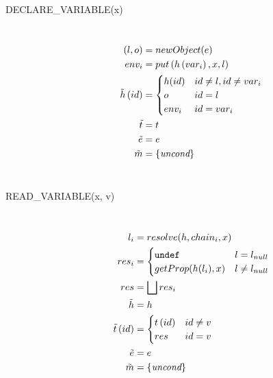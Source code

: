 \begin{description}
  \item[{\small\ttfamily DECLARE\_VARIABLE(x)}] ~\\%
  \[
  \begin{aligned}
    \left( l, o \right) &= newObject(e) \\
    env_i &= put\left( h\left( var_i \right), x, l \right) \\ 
    \tilde{h}\left( id \right) &= 
      \begin{cases}
	h(id) & id \neq l, id \neq var_i \\
	o & id = l \\
	env_i & id = var_i \\
      \end{cases} \\
    \tilde{t} &= t \\
    \tilde{e} &= e \\
    \tilde{m} &= \{\emph{uncond}\} \\
  \end{aligned}
  \] 
  \\
  \item[{\small\ttfamily READ\_VARIABLE(x, v)}] ~\\%
  \[
  \begin{aligned}
    l_i &= resolve(h, chain_i, x) \\
    res_i &= \begin{cases}
      \texttt{undef} & l = l_{null} \\
      getProp(h(l_i), x) & l \neq l_{null} \\
    \end{cases} \\
    res &= \bigsqcup res_i \\
    \tilde{h} &= h \\ 
    \tilde{t}\left( id \right) &= 
      \begin{cases}
	 t\left( id \right) & id \neq v \\
	 res & id = v \\
      \end{cases} \\ 
    \tilde{e} &= e \\
  \tilde{m} &= \{\emph{uncond}\} \\
  \end{aligned}
  \]
  \\

\end{description}
